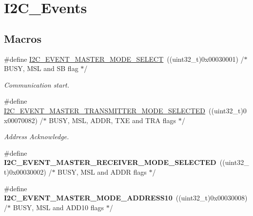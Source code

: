 \hypertarget{group___i2_c___events}{\section{I2\-C\-\_\-\-Events}
\label{group___i2_c___events}
}
\subsection*{Macros}
\begin{DoxyCompactItemize}
\item 
\#define \hyperlink{group___i2_c___events_gaeef8c22ac035122b06e31b360ac7aeb3}{I2\-C\-\_\-\-E\-V\-E\-N\-T\-\_\-\-M\-A\-S\-T\-E\-R\-\_\-\-M\-O\-D\-E\-\_\-\-S\-E\-L\-E\-C\-T}~((uint32\-\_\-t)0x00030001)  /$\ast$ B\-U\-S\-Y, M\-S\-L and S\-B flag $\ast$/
\begin{DoxyCompactList}\small\item\em Communication start. \end{DoxyCompactList}\item 
\#define \hyperlink{group___i2_c___events_ga2361a6e60b7dc86fb682dd06fbd3edb7}{I2\-C\-\_\-\-E\-V\-E\-N\-T\-\_\-\-M\-A\-S\-T\-E\-R\-\_\-\-T\-R\-A\-N\-S\-M\-I\-T\-T\-E\-R\-\_\-\-M\-O\-D\-E\-\_\-\-S\-E\-L\-E\-C\-T\-E\-D}~((uint32\-\_\-t)0x00070082)  /$\ast$ B\-U\-S\-Y, M\-S\-L, A\-D\-D\-R, T\-X\-E and T\-R\-A flags $\ast$/
\begin{DoxyCompactList}\small\item\em Address Acknowledge. \end{DoxyCompactList}\item 
\hypertarget{group___i2_c___events_gabfde82864432ddb87b6462234d542e60}{\#define {\bfseries I2\-C\-\_\-\-E\-V\-E\-N\-T\-\_\-\-M\-A\-S\-T\-E\-R\-\_\-\-R\-E\-C\-E\-I\-V\-E\-R\-\_\-\-M\-O\-D\-E\-\_\-\-S\-E\-L\-E\-C\-T\-E\-D}~((uint32\-\_\-t)0x00030002)  /$\ast$ B\-U\-S\-Y, M\-S\-L and A\-D\-D\-R flags $\ast$/}\label{group___i2_c___events_gabfde82864432ddb87b6462234d542e60}

\item 
\hypertarget{group___i2_c___events_gad04882597bbf542c6fee7a9c837fbc8c}{\#define {\bfseries I2\-C\-\_\-\-E\-V\-E\-N\-T\-\_\-\-M\-A\-S\-T\-E\-R\-\_\-\-M\-O\-D\-E\-\_\-\-A\-D\-D\-R\-E\-S\-S10}~((uint32\-\_\-t)0x00030008)  /$\ast$ B\-U\-S\-Y, M\-S\-L and A\-D\-D10 flags $\ast$/}\label{group___i2_c___events_gad04882597bbf542c6fee7a9c837fbc8c}


\end{DoxyCompactItemize}

